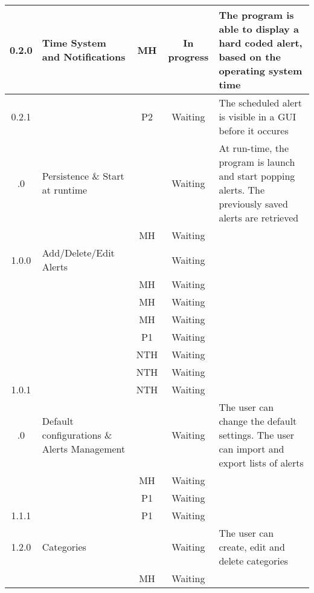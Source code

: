 \begin{longtable}{| c | p{5cm} | c | c | p{5cm} |}
	\rowcolor{aliceblue}0.2.0 & Time System and Notifications & MH & In progress & The program is able to display a hard coded alert, based on the operating system time \\ \hline
	\rowcolor{aliceblue}0.2.1 & \fullref{subsec:usecase_launch} & P2 & Waiting & The scheduled alert is visible in a GUI before it occures \\ \boldhr
	0.3.0 & Persistence \& Start at runtime & & Waiting & At run-time, the program is launch and start popping alerts. The previously saved alerts are retrieved \\ \hline
	& \fullref{subsec:usecase_auto_start} & MH & Waiting & \\ \boldhr
	\rowcolor{aliceblue}1.0.0 & Add/Delete/Edit Alerts & & Waiting &  \\ \hline
	\rowcolor{aliceblue}& \fullref{subsec:usecase_add_simple_alert} & MH & Waiting &  \\ \hline
	\rowcolor{aliceblue}& \fullref{subsec:usecase_delete_simple_alert} & MH & Waiting &  \\ \hline
	\rowcolor{aliceblue}& \fullref{subsec:usecase_edit_simple_alert} & MH & Waiting &  \\ \hline
	\rowcolor{aliceblue}& \fullref{subsec:usecase_add_periodic_alert} & P1 & Waiting &  \\ \hline
	\rowcolor{aliceblue}& \fullref{subsec:usecase_add_email_sender} & NTH & Waiting &  \\ \hline
	\rowcolor{aliceblue}& \fullref{subsec:usecase_delete_email_sender} & NTH & Waiting &  \\ \hline
	\rowcolor{aliceblue}1.0.1 & \fullref{subsec:usecase_edit_email_sender} & NTH & Waiting &  \\ \boldhr
	1.1.0 & Default configurations \& Alerts Management &  & Waiting & The user can change the default settings. The user can import and export lists of alerts\\ \hline
	& \fullref{subsec:usecase_edit_default_configuration} & MH & Waiting & \\ \hline
	& \fullref{subsec:usecase_import_alerts} & P1 & Waiting & \\ \hline
	1.1.1 & \fullref{subsec:usecase_export_alerts} & P1 & Waiting &\\ \boldhr
	\rowcolor{aliceblue}1.2.0 & Categories & & Waiting & The user can create, edit and delete categories \\ \hline
	\rowcolor{aliceblue}& \fullref{subsec:usecase_add_category} & MH & Waiting & \\ \hline

\end{longtable}
